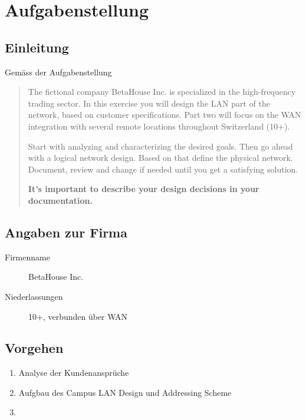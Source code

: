 

\newcommand{\SUBJECT}{Report}
\newcommand{\TITLE}{Cloud Infrastructre Lab 2}



\section{Aufgabenstellung}
\subsection{Einleitung}
Gemäss der Aufgabenstellung

\begin{quotation}
	The fictional company BetaHouse Inc. is specialized in the high-frequency trading sector. In this exercise you will design the LAN part of the network, based on customer specifications. Part two will focus on the WAN integration with several remote locations throughout Switzerland (10+).
	
	Start with analyzing and characterizing the desired goals. Then go ahead with a logical network design. Based on that define the physical network. Document, review and change if needed until you get a satisfying solution. 
	
	\textbf{It’s important to describe your design decisions in your documentation.}
\end{quotation}

\subsection{Angaben zur Firma}

\begin{description}
	\item[Firmenname] BetaHouse Inc.
	\item[Niederlassungen] 10+, verbunden über WAN
\end{description}

\subsection{Vorgehen}

\begin{enumerate}
	\item Analyse der Kundenansprüche
	\item Aufgbau des Campus LAN Design und Addressing Scheme
	\item 
\end{enumerate}


